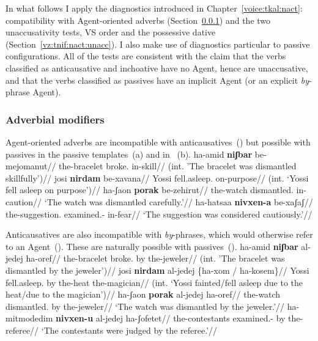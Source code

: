 In what follows I apply the diagnostics introduced in Chapter~\ref{voice:tkal:nact}: compatibility with Agent-oriented adverbs (Section~\ref{vz:tnif:nact:adv}) and the two unaccusativity tests, VS order and the possessive dative (Section~\ref{vz:tnif:nact:unacc}). I also make use of diagnostics particular to passive configurations. All of the tests are consistent with the claim that the verbs classified as anticausative and inchoative have no Agent, hence are unaccusative, and that the verbs classified as passives have an implicit Agent (or an explicit \emph{by}-phrase Agent).

	\subsubsection{Adverbial modifiers} \label{vz:tnif:nact:adv}
Agent-oriented adverbs are incompatible with anticausatives~(\nextx) but possible with passives in the passive templates~(\anextx a) and in {\tnif}~(\anextx b).
\pex 
	\a	\ljudge{*} \begingl
		\gla ha-{\ts}amid \textbf{niʃbar} be-mejomanut//
		\glb the-bracelet broke. in-skill//
		\glft (int. 'The bracelet was dismantled skillfully')//
		\endgl
	\a {} \begingl
		\gla josi \textbf{nirdam} be-xavana//
		\glb Yossi fell.asleep. on-purpose//
		\glft (int. `Yossi fell asleep on purpose')//
		\endgl
\xe
\pex
	\a	\begingl
		\gla ha-ʃaon \textbf{porak} be-zehirut//
		\glb the-watch dismantled. in-caution//
		\glft `The watch was dismantled carefully.'//
		\endgl
	\a
		\begingl
		\gla ha-hatsaa \textbf{nivxen-a} be-xaʃaʃ//
		\glb the-suggestion. examined.- in-fear//
		\glft `The suggestion was considered cautiously.'//
		\endgl
\xe

Anticausatives are also incompatible with \emph{by}-phrases, which would otherwise refer to an Agent~(\nextx). These are naturally possible with passives~(\anextx).
\pex
	\a \ljudge{*} \begingl
		\gla ha-{\ts}amid \textbf{niʃbar} al-jedej ha-{\ts}oref//
		\glb the-bracelet broke. by the-jeweler//
		\glft (int. 'The bracelet was dismantled by the jeweler')//
	\endgl
	\a \ljudge{*} \begingl
		\gla josi \textbf{nirdam} al-jedej \{ha-xom / ha-kosem\}//
		\glb Yossi fell.asleep. by the-heat {} the-magician//
		\glft (int. `Yossi fainted/fell asleep due to the heat/due to the magician')//
	\endgl
\xe
\pex
	\a \begingl
		\gla ha-ʃaon \textbf{porak} al-jedej ha-{\ts}oref//
		\glb the-watch dismantled. by the-jeweler//
		\glft `The watch was dismantled by the jeweler.'//
		\endgl
	\a \begingl
		\gla ha-mitmodedim \textbf{nivxen-u} al-jedej ha-ʃofetet//
		\glb the-contestants examined.- by the-referee//
		\glft `The contestants were judged by the referee.'//
		\endgl
\xe

